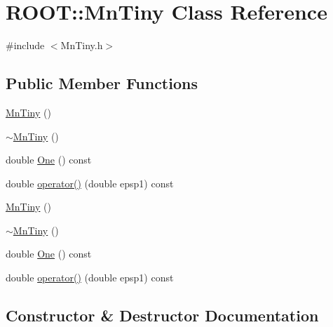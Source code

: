 \hypertarget{classROOT_1_1Minuit2_1_1MnTiny}{}\section{R\+O\+OT\+:\+:Mn\+Tiny Class Reference}
\label{classROOT_1_1Minuit2_1_1MnTiny}


{\ttfamily \#include $<$Mn\+Tiny.\+h$>$}

\subsection*{Public Member Functions}
\begin{DoxyCompactItemize}
\item 
\mbox{\hyperlink{classROOT_1_1Minuit2_1_1MnTiny_a4dde4acb4a2fbc96da80a4c3a507b87f}{Mn\+Tiny}} ()
\item 
\mbox{\hyperlink{classROOT_1_1Minuit2_1_1MnTiny_a6d03471f2c8c81a1bdc7a6a4c24e4e65}{$\sim$\+Mn\+Tiny}} ()
\item 
double \mbox{\hyperlink{classROOT_1_1Minuit2_1_1MnTiny_a5934fc324da865f57dc05e5182248677}{One}} () const
\item 
double \mbox{\hyperlink{classROOT_1_1Minuit2_1_1MnTiny_ae266eaf0c58687bf37419ca463c51bf7}{operator()}} (double epsp1) const
\item 
\mbox{\hyperlink{classROOT_1_1Minuit2_1_1MnTiny_a4dde4acb4a2fbc96da80a4c3a507b87f}{Mn\+Tiny}} ()
\item 
\mbox{\hyperlink{classROOT_1_1Minuit2_1_1MnTiny_a6d03471f2c8c81a1bdc7a6a4c24e4e65}{$\sim$\+Mn\+Tiny}} ()
\item 
double \mbox{\hyperlink{classROOT_1_1Minuit2_1_1MnTiny_a5934fc324da865f57dc05e5182248677}{One}} () const
\item 
double \mbox{\hyperlink{classROOT_1_1Minuit2_1_1MnTiny_ae266eaf0c58687bf37419ca463c51bf7}{operator()}} (double epsp1) const
\end{DoxyCompactItemize}


\subsection{Constructor \& Destructor Documentation}
\mbox{\label{classROOT_1_1Minuit2_1_1MnTiny_a4dde4acb4a2fbc96da80a4c3a507b87f}} 
